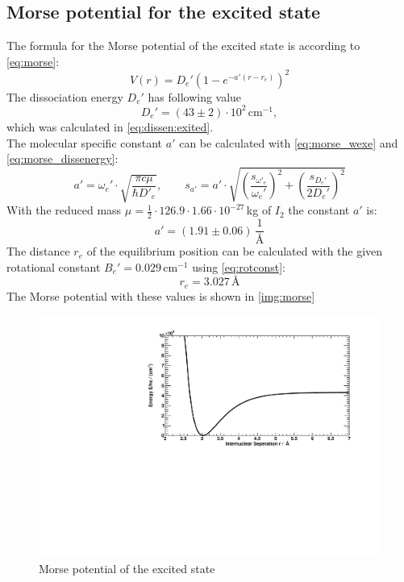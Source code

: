 \subsection{Morse potential for the excited state}
The formula for the Morse potential of the excited state is according to \autoref{eq:morse}:
\begin{equation}
  V(r) = D_e' \left( 1 - e^{-a'(r-r_e)} \right)^2
\end{equation}
The dissociation energy $D_e'$ has following value
\begin{equation}
  D_e' = (43 \pm 2) \cdot 10^2\, \text{cm}^{-1},
\end{equation}
which was calculated in \autoref{eq:dissen:exited}. \\
The molecular specific constant $a'$ can be calculated with \autoref{eq:morse_wexe} and \autoref{eq:morse_dissenergy}:
\begin{equation}
  a' = \omega_e' \cdot \sqrt{\frac{\pi c \mu}{\hbar D'_e}}, \qquad s_{a'} = 
  a' \cdot \sqrt{\left( \frac{s_{\omega'_e}}{\omega_e'} \right)^2 +  \left( \frac{s_{D_e'}}{2 D_e'} \right)^2 }
\end{equation}
With the reduced mass $\mu = \frac{1}{2} \cdot 126.9 \cdot 1.66 \cdot 10^{-27}\,$kg of $I_2$ the constant $a'$ is:
\begin{equation}
  a' = (1.91 \pm 0.06)\, \frac{1}{\text{\AA}}
\end{equation}
The distance $r_e$ of the equilibrium position can be calculated with the given rotational constant $B_e' = 0.029\, \text{cm}^{-1}$ using 
\autoref{eq:rotconst}:
\begin{equation}
  r_e = 3.027\,\text{\AA}
\end{equation}
The Morse potential with these values is shown in \autoref{img:morse}

\begin{figure}[H]
\begin{center}
  \includegraphics[width=\textwidth]{../img/morse.pdf}
  \caption[---]{Morse potential of the excited state}
  \label{img:morse}
\end{center}
\end{figure}

